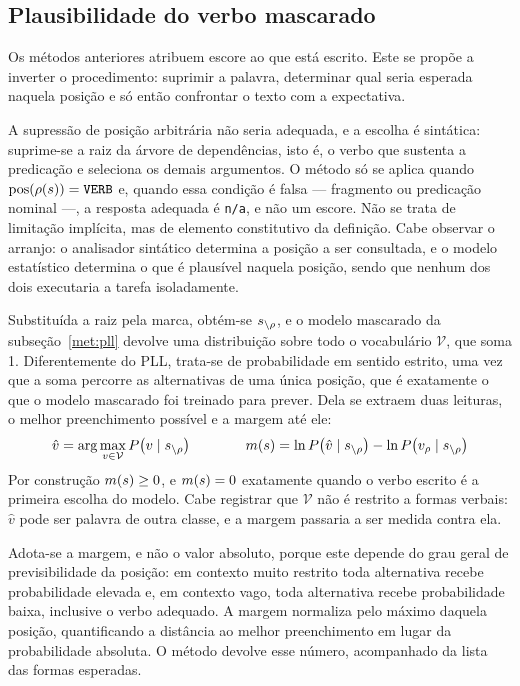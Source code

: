 \subsection{Plausibilidade do verbo mascarado}
\label{met:verbo}

\indent\indent Os métodos anteriores atribuem escore ao que está escrito. Este se propõe a inverter o
procedimento: suprimir a palavra, determinar qual seria esperada naquela posição e só então
confrontar o texto com a expectativa.

A supressão de posição arbitrária não seria adequada, e a escolha é sintática: suprime-se a
raiz da árvore de dependências, isto é, o verbo que sustenta a predicação e seleciona os
demais argumentos. O método só se aplica quando $\mathrm{pos}(\rho(s)) = \texttt{VERB}$
e, quando essa condição é falsa --- fragmento ou predicação nominal ---, a resposta adequada é
\texttt{n/a}, e não um escore. Não se trata de limitação implícita, mas de elemento
constitutivo da definição. Cabe observar o arranjo: o analisador sintático determina a posição
a ser consultada, e o modelo estatístico determina o que é plausível naquela posição, sendo
que nenhum dos dois executaria a tarefa isoladamente.

Substituída a raiz pela marca, obtém-se $s_{\setminus\rho}$, e o modelo mascarado da
subseção~\ref{met:pll} devolve uma distribuição sobre todo o vocabulário $\mathcal{V}$, que
soma 1. Diferentemente do PLL, trata-se de probabilidade em sentido estrito, uma vez que a
soma percorre as alternativas de uma única posição, que é exatamente o que o modelo mascarado
foi treinado para prever. Dela se extraem duas leituras, o melhor preenchimento possível e a
margem até ele:
%
\begin{equation}
\hat{v} = \arg\max_{v \in \mathcal{V}} P\bigl(v \mid s_{\setminus\rho}\bigr)
\qquad\qquad
m(s) = \ln P\bigl(\hat{v} \mid s_{\setminus\rho}\bigr) - \ln P\bigl(v_\rho \mid s_{\setminus\rho}\bigr)
\label{eq:verbo-margem}
\end{equation}
%
Por construção $m(s) \geq 0$, e $m(s) = 0$ exatamente quando o verbo escrito é a
primeira escolha do modelo. Cabe registrar que $\mathcal{V}$ não é restrito a formas verbais:
$\hat{v}$ pode ser palavra de outra classe, e a margem passaria a ser medida contra ela.

Adota-se a margem, e não o valor absoluto, porque este depende do grau geral de
previsibilidade da posição: em contexto muito restrito toda alternativa recebe probabilidade
elevada e, em contexto vago, toda alternativa recebe probabilidade baixa, inclusive o verbo
adequado. A margem normaliza pelo máximo daquela posição, quantificando a distância ao melhor
preenchimento em lugar da probabilidade absoluta. O método devolve esse número, acompanhado da
lista das formas esperadas.
